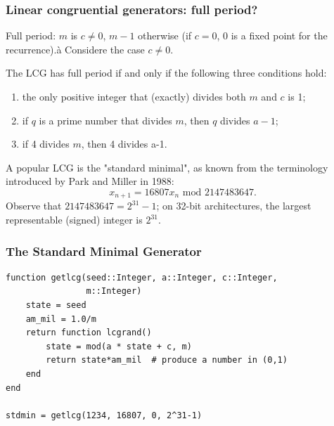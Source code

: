 \documentclass{beamer}
\begin{document}
	\begin{frame}
		\frametitle{Linear congruential generators: full period?}
		
		Full period: $m$ is $c \ne 0$, $m-1$ otherwise (if $c = 0$, 0 is a
		fixed point for the recurrence).à Considere the case $c \ne 0$.
		
		\begin{theorem}[Period]
			The LCG has full period if and only if the
			following three conditions hold:
			\begin{enumerate}
				\item
				the only positive integer that (exactly) divides both $m$ and $c$ is
				1;
				\item
				if $q$ is a prime number that divides $m$, then $q$ divides $a-1$;
				\item
				if 4 divides $m$, then 4 divides a-1.
			\end{enumerate}
		\end{theorem}
		A popular LCG is the "{\red standard minimal}", as known from the
		terminology introduced by Park and Miller in 1988:
		\[
		x_{n+1} = 16807x_n \mbox{ mod } 2147483647.
		\]
		Observe that $2147483647 = 2^{31}-1$; on 32-bit architectures, the
		largest representable (signed) integer is $2^{31}$.
		
	\end{frame}
	
	\begin{frame}[containsverbatim]
		\frametitle{The Standard Minimal Generator}
		
		\begin{small}
			\begin{verbatim}
function getlcg(seed::Integer, a::Integer, c::Integer,
                m::Integer)
    state = seed
    am_mil = 1.0/m
    return function lcgrand()
        state = mod(a * state + c, m)
        return state*am_mil  # produce a number in (0,1)
    end
end

stdmin = getlcg(1234, 16807, 0, 2^31-1)
		\end{verbatim}
		\end{small}
		
	\end{frame}
	
\end{document}
